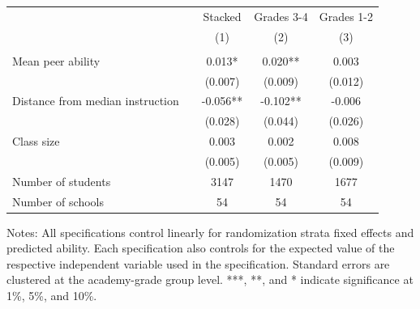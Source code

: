 \begin{center} 
\caption{\small Effect on test scores} 
\label{tab:descriptives} 
\begin{small}
\begin{threeparttable}
\begin{tabular} {@{} l l  c c c  @{}} \toprule \toprule
 & & Stacked & Grades 3-4  & Grades 1-2 \\
& &(1)&(2)&(3) \\ \midrule 
\\
Mean peer ability &  & 0.013* & 0.020** & 0.003 \\
                 &  & (0.007) & (0.009) & (0.012) \\
Distance from median instruction &  & -0.056** & -0.102** & -0.006 \\
                 &  & (0.028) & (0.044) & (0.026) \\
Class size &  & 0.003 & 0.002 & 0.008 \\
                 &  & (0.005) & (0.005) & (0.009) \\
\midrule
Number of students &  & 3147 & 1470 & 1677 \\
Number of schools &  & 54 & 54 & 54 \\
\bottomrule
\end{tabular}
\begin{tablenotes}
\item Notes: All specifications control linearly for randomization strata fixed effects and predicted ability. Each specification also controls for the expected value of the respective independent variable used in the specification. Standard errors are clustered at the academy-grade group level. ***, **, and * indicate significance at 1\%, 5\%, and 10\%.\end{tablenotes}
\end{threeparttable}
\end{small}
\end{center}
\clearpage
